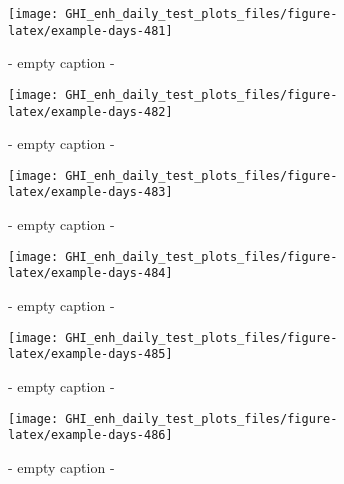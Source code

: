 \documentclass[
  10pt,
  a4paper,oneside]{article}
\begin{document}
\begin{figure}[H]

{\centering \texttt{[image: GHI\_enh\_daily\_test\_plots\_files/figure-latex/example-days-481]} 

}

\caption{ - empty caption - }\label{fig:example-days-481}
\end{figure}

\begin{figure}[H]

{\centering \texttt{[image: GHI\_enh\_daily\_test\_plots\_files/figure-latex/example-days-482]} 

}

\caption{ - empty caption - }\label{fig:example-days-482}
\end{figure}

\begin{figure}[H]

{\centering \texttt{[image: GHI\_enh\_daily\_test\_plots\_files/figure-latex/example-days-483]} 

}

\caption{ - empty caption - }\label{fig:example-days-483}
\end{figure}

\begin{figure}[H]

{\centering \texttt{[image: GHI\_enh\_daily\_test\_plots\_files/figure-latex/example-days-484]} 

}

\caption{ - empty caption - }\label{fig:example-days-484}
\end{figure}

\begin{figure}[H]

{\centering \texttt{[image: GHI\_enh\_daily\_test\_plots\_files/figure-latex/example-days-485]} 

}

\caption{ - empty caption - }\label{fig:example-days-485}
\end{figure}

\begin{figure}[H]

{\centering \texttt{[image: GHI\_enh\_daily\_test\_plots\_files/figure-latex/example-days-486]} 

}

\caption{ - empty caption - }\label{fig:example-days-486}
\end{figure}
\end{document}
